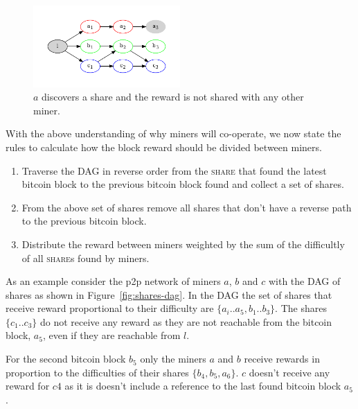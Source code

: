\documentclass{article}
\begin{document}
\begin{figure}[h]
  \begin{center}
    \includegraphics[width=0.5\textwidth]{isolated-miners}
    \caption{$a$ discovers a share and the reward is not shared with any
      other miner.}\label{fig:isolated-miners}
  \end{center}    
\end{figure}

With the above understanding of why miners will co-operate, we now
state the rules to calculate how the block reward should be divided
between miners.

\begin{enumerate}
  \item Traverse the DAG in reverse order from the \textsc{share} that
    found the latest bitcoin block to the previous bitcoin block found
    and collect a set of shares.
  \item From the above set of shares remove all shares that don't have
    a reverse path to the previous bitcoin block.
  \item Distribute the reward between miners weighted by the sum of
    the difficultly of all \textsc{share}s found by miners.
\end{enumerate}

As an example consider the p2p network of miners $a$, $b$ and $c$ with
the DAG of shares as shown in Figure~\ref{fig:shares-dag}. In the DAG
the set of shares that receive reward proportional to their
difficulty are $\{a_i..a_5, b_1..b_3\}$. The shares $\{c_1..c_3\}$ do
not receive any reward as they are not reachable from the bitcoin
block, $a_5$, even if they are reachable from $l$.

For the second bitcoin block $b_5$ only the miners $a$ and $b$ receive
rewards in proportion to the difficulties of their shares $\{b_4, b_5,
a_6\}$. $c$ doesn't receive any reward for $c4$ as it is doesn't
include a reference to the last found bitcoin block $a_5$.
\end{document}
